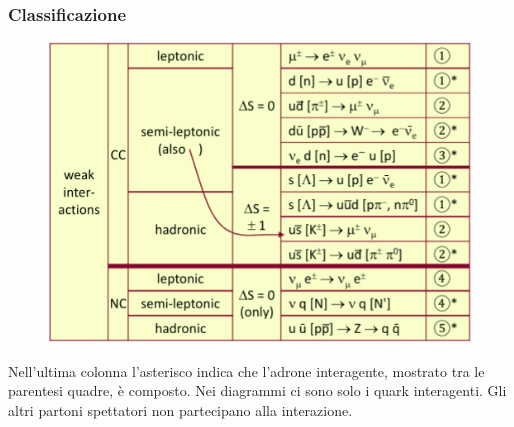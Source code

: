 \subsubsection{Classificazione}
\begin{minipage}{0.6\textwidth}
    \begin{figure}[H]
        \includegraphics[width=\textwidth]{immagini/fig_table_weak_int.png}
    \end{figure}
    Nell'ultima colonna l'asterisco indica che l'adrone interagente, mostrato tra le parentesi quadre, è composto. Nei diagrammi ci sono solo i quark interagenti. Gli altri partoni spettatori non partecipano alla interazione.
\end{minipage}
